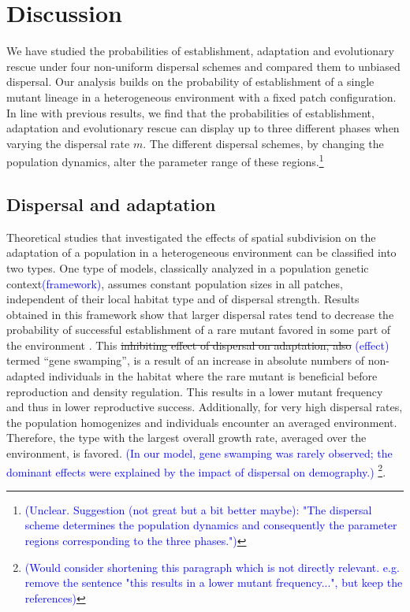 \documentclass[11pt]{article}
\newcommand{\francois}[1]{\textcolor{blue}{(#1)}}
\newcommand{\chg}[1]{\textcolor{change}{#1}}
\begin{document}
\section*{Discussion}
%
We have studied the probabilities of establishment, adaptation and evolutionary rescue under four non-\chg{uniform} dispersal schemes and compared them to \chg{unbiased} dispersal. Our analysis builds on the probability of establishment of a single mutant lineage in a heterogeneous environment with a fixed patch configuration. In line with previous results, we find that the probabilities of establishment, adaptation and evolutionary rescue can display up to three different phases when varying the dispersal rate $m$.
The different dispersal schemes, by changing the population dynamics, \chg{alter the parameter range of these regions.}\footnote{\francois{Unclear. Suggestion (not great but a bit better maybe): "The dispersal scheme determines the population dynamics and consequently the parameter regions corresponding to the three phases."}}


\subsection*{Dispersal and adaptation}
Theoretical studies that investigated the effects of spatial subdivision on the adaptation of a population in a heterogeneous environment can be classified into two types. One type of models, classically analyzed in a population genetic context\francois{framework}, assumes constant population sizes in all patches, independent of their local habitat type and of dispersal strength. Results obtained in this framework show that larger dispersal rates tend to decrease the probability of successful establishment of a rare mutant favored in some part of the environment \citep[e.g.][]{garcia_1997}. This \st{inhibiting effect of dispersal on adaptation, also} \francois{effect} termed ``gene swamping'', is a result of an increase in absolute numbers of non-adapted individuals in the habitat where the rare mutant is beneficial \chg{before reproduction and density regulation. This results in a lower mutant frequency \citep{lenormand_2002,tomasini_2018} and thus in lower reproductive success.} Additionally, for very high dispersal rates, the population homogenizes and individuals encounter an averaged environment. Therefore, the type with the largest overall growth rate, averaged over the environment, is favored.  \francois{In our model, gene swamping was rarely observed; the dominant effects were explained by the impact of dispersal on demography.} \footnote{\francois{Would consider shortening this paragraph which is not directly relevant. e.g. remove the sentence "this results in a lower mutant frequency...", but keep the references}}.
\end{document}
